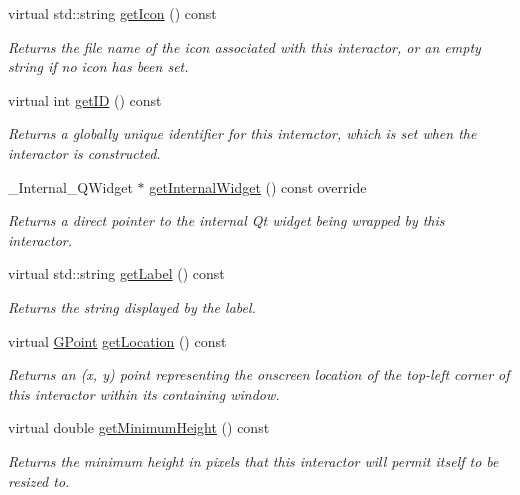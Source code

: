 \begin{DoxyCompactItemize}
virtual std\+::string \mbox{\hyperlink{classsgl_1_1GInteractor_aaed62a73004939a64da6f0eb9eb64d73}{get\+Icon}} () const
\begin{DoxyCompactList}\small\item\em Returns the file name of the icon associated with this interactor, or an empty string if no icon has been set. \end{DoxyCompactList}\item 
virtual int \mbox{\hyperlink{classsgl_1_1GInteractor_a9c9659a6c6ba66b4107ba59c95a24241}{get\+ID}} () const
\begin{DoxyCompactList}\small\item\em Returns a globally unique identifier for this interactor, which is set when the interactor is constructed. \end{DoxyCompactList}\item 
\+\_\+\+Internal\+\_\+\+Q\+Widget $\ast$ \mbox{\hyperlink{classsgl_1_1GLabel_a2f6b36b2517087dc90a366b5ce1f5323}{get\+Internal\+Widget}} () const override
\begin{DoxyCompactList}\small\item\em Returns a direct pointer to the internal Qt widget being wrapped by this interactor. \end{DoxyCompactList}\item 
virtual std\+::string \mbox{\hyperlink{classsgl_1_1GLabel_aa73aa351564b091c0658f2368c6d5c5f}{get\+Label}} () const
\begin{DoxyCompactList}\small\item\em Returns the string displayed by the label. \end{DoxyCompactList}\item 
virtual \mbox{\hyperlink{structsgl_1_1GPoint}{G\+Point}} \mbox{\hyperlink{classsgl_1_1GInteractor_a4f83802015511edeb63b892830812c11}{get\+Location}} () const
\begin{DoxyCompactList}\small\item\em Returns an (x, y) point representing the onscreen location of the top-\/left corner of this interactor within its containing window. \end{DoxyCompactList}\item 
virtual double \mbox{\hyperlink{classsgl_1_1GInteractor_aed4b0075fcc434499c3cb3e46896bda3}{get\+Minimum\+Height}} () const
\begin{DoxyCompactList}\small\item\em Returns the minimum height in pixels that this interactor will permit itself to be resized to. \end{DoxyCompactList}\item 

\end{DoxyCompactItemize}
